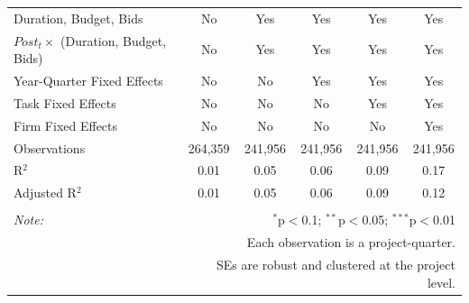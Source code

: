 \documentclass[
]{article}
\begin{document}
\begin{table}[H]
\begin{tabular}{@{\extracolsep{-2pt}}lccccc}
Duration, Budget, Bids & No & Yes & Yes & Yes & Yes \\ 
$Post_t \times $  (Duration, Budget, Bids) & No & Yes & Yes & Yes & Yes \\ 
Year-Quarter Fixed Effects & No & No & Yes & Yes & Yes \\ 
Task Fixed Effects & No & No & No & Yes & Yes \\ 
Firm Fixed Effects & No & No & No & No & Yes \\ 
Observations & 264,359 & 241,956 & 241,956 & 241,956 & 241,956 \\ 
R$^{2}$ & 0.01 & 0.05 & 0.06 & 0.09 & 0.17 \\ 
Adjusted R$^{2}$ & 0.01 & 0.05 & 0.06 & 0.09 & 0.12 \\ 
\hline 
\hline \\[-1.8ex] 
\textit{Note:}  & \multicolumn{5}{r}{$^{*}$p$<$0.1; $^{**}$p$<$0.05; $^{***}$p$<$0.01} \\ 
 & \multicolumn{5}{r}{Each observation is a project-quarter.} \\ 
 & \multicolumn{5}{r}{SEs are robust and clustered at the project level.} \\ 
\end{tabular} 
\end{table}
\end{document}
